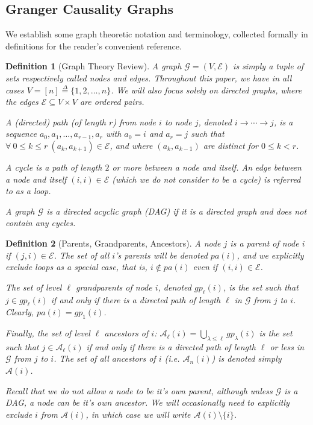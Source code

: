 \documentclass{statsoc}
\def\gcg{\mathcal{G}}  %
\def\gcge{\mathcal{E}}  %
\newcommand{\pa}[1]{pa(#1)}  %
\newcommand{\anc}[1]{\mathcal{A}(#1)}  %
\newcommand{\ancn}[2]{\mathcal{A}_{#1}(#2)}  %
\newcommand{\gpn}[2]{gp_{#1}(#2)}  %
\newcommand{\gcgpath}[2]{#1 \rightarrow \cdots \rightarrow #2}  %
\newtheorem{definition}{Definition}
\def\defeq{\overset{\Delta}{=}}  %
\begin{document}
\subsection{Granger Causality Graphs}
We establish some graph theoretic notation and terminology, collected
formally in definitions for the reader's convenient reference.

\begin{definition}[Graph Theory Review]
  A \textit{graph} $\gcg = (V, \gcge)$ is simply a
  tuple of sets respectively called \textit{nodes} and \textit{edges}.
  Throughout this paper, we have in all cases
  $V = [n] \defeq \{1, 2, \ldots, n\}$.  We will also focus solely on
  \textit{directed} graphs, where the edges
  $\gcge \subseteq V \times V$ are \textit{ordered} pairs.

  A (directed) \textit{path} (of length $r$) from node $i$ to node
  $j$, denoted $\gcgpath{i}{j}$, is a sequence
  $a_0, a_1, \ldots, a_{r - 1}, a_r$ with $a_0 = i$ and $a_r = j$ such
  that $\forall\ 0 \le k \le r\ (a_k, a_{k + 1}) \in \gcge$, and where
  $(a_k, a_{k - 1})$ are \textit{distinct} for $0 \le k < r$.

  A \textit{cycle} is a path of length $2$ or more between a node and
  itself.  An edge between a node and itself $(i, i) \in \gcge$ (which
  we do not consider to be a cycle) is referred to as a \textit{loop}.

  A graph $\gcg$ is a \textit{directed acyclic graph} (DAG) if it is a
  directed graph and does not contain any cycles.
\end{definition}

\begin{definition}[Parents, Grandparents, Ancestors]
  A node $j$ is a \textit{parent} of node $i$ if $(j, i) \in \gcge$.
  The set of all $i$'s parents will be denoted $\pa{i}$, and we
  explicitly exclude loops as a special case, that is,
  $i \not\in \pa{i}$ even if $(i, i) \in \gcge$.

  The set of level $\ell$ \textit{grandparents} of node $i$, denoted
  $\gpn{\ell}{i}$, is the set such that $j \in \gpn{\ell}{i}$ if and
  only if there is a \textit{directed path} of length $\ell$ in $\gcg$
  from $j$ to $i$.  Clearly, $\pa{i} = \gpn{1}{i}$.

  Finally, the set of \textit{level $\ell$ ancestors} of $i$:
  $\ancn{\ell}{i} = \bigcup_{\lambda \le \ell}\gpn{\lambda}{i}$ is the
  set such that $j \in \ancn{\ell}{i}$ if and only if there is a
  directed path of length $\ell$ \textit{or less} in $\gcg$ from $j$
  to $i$.  The set of \textit{all ancestors} of $i$
  (i.e. $\ancn{n}{i}$) is denoted simply $\anc{i}$.

  Recall that we do not allow a node to be it's own parent, although
  unless $\gcg$ is a DAG, a node \textit{can} be it's own ancestor.
  We will occasionally need to explicitly exclude $i$ from $\anc{i}$,
  in which case we will write $\anc{i}\setminus \{i\}$.
\end{definition}
\end{document}
